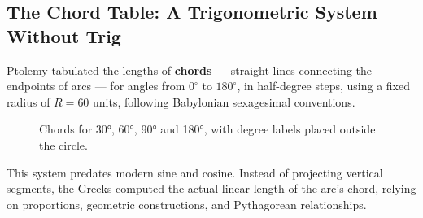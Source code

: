 \subsection{The Chord Table: A Trigonometric System Without Trig}

Ptolemy tabulated the lengths of \textbf{chords} — straight lines connecting the endpoints of arcs — for angles from \( 0^\circ \) to \( 180^\circ \), in half-degree steps, using a fixed radius of \( R = 60 \) units, following Babylonian sexagesimal conventions.

\medskip

\begin{figure}[H]
    \centering
    \caption{Chords for 30°, 60°, 90° and 180°, with degree labels placed outside the circle.}
\end{figure}

\medskip

This system predates modern sine and cosine. Instead of projecting vertical segments, the Greeks computed the actual linear length of the arc’s chord, relying on proportions, geometric constructions, and Pythagorean relationships.

\medskip

